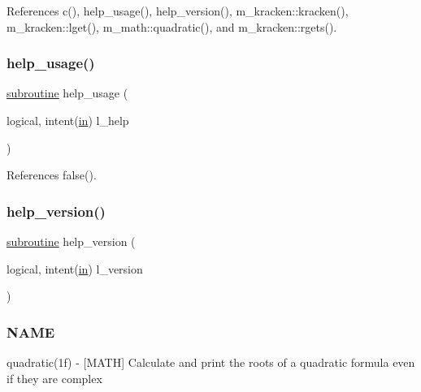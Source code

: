 References c(), help\+\_\+usage(), help\+\_\+version(), m\+\_\+kracken\+::kracken(), m\+\_\+kracken\+::lget(), m\+\_\+math\+::quadratic(), and m\+\_\+kracken\+::rgets().

\mbox{\label{quadratic_8f90_a3e09a3b52ee8fb04eeb93fe5761626a8}} 
\subsubsection{\texorpdfstring{help\+\_\+usage()}{help\_usage()}}
{\footnotesize\ttfamily \hyperlink{M__stopwatch_83_8txt_acfbcff50169d691ff02d4a123ed70482}{subroutine} help\+\_\+usage (\begin{DoxyParamCaption}\item[{logical, intent(\hyperlink{M__journal_83_8txt_afce72651d1eed785a2132bee863b2f38}{in})}]{l\+\_\+help }\end{DoxyParamCaption})}



References false().

\mbox{\label{quadratic_8f90_a39c21619b08a3c22f19e2306efd7f766}} 
\subsubsection{\texorpdfstring{help\+\_\+version()}{help\_version()}}
{\footnotesize\ttfamily \hyperlink{M__stopwatch_83_8txt_acfbcff50169d691ff02d4a123ed70482}{subroutine} help\+\_\+version (\begin{DoxyParamCaption}\item[{logical, intent(\hyperlink{M__journal_83_8txt_afce72651d1eed785a2132bee863b2f38}{in})}]{l\+\_\+version }\end{DoxyParamCaption})}



\subsubsection*{N\+A\+ME}

quadratic(1f) -\/ \mbox{[}M\+A\+TH\mbox{]} Calculate and print the roots of a quadratic formula even if they are complex 

